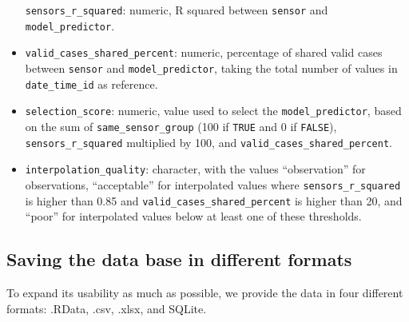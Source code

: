 \documentclass[]{article}
\begin{document}
\begin{itemize}
  \texttt{sensors\_r\_squared}: numeric, R squared between
  \texttt{sensor} and \texttt{model\_predictor}.
\item
  \texttt{valid\_cases\_shared\_percent}: numeric, percentage of shared
  valid cases between \texttt{sensor} and \texttt{model\_predictor},
  taking the total number of values in \texttt{date\_time\_id} as
  reference.
\item
  \texttt{selection\_score}: numeric, value used to select the
  \texttt{model\_predictor}, based on the sum of
  \texttt{same\_sensor\_group} (100 if \texttt{TRUE} and 0 if
  \texttt{FALSE}), \texttt{sensors\_r\_squared} multiplied by 100, and
  \texttt{valid\_cases\_shared\_percent}.
\item
  \texttt{interpolation\_quality}: character, with the values
  ``observation'' for observations, ``acceptable'' for interpolated
  values where \texttt{sensors\_r\_squared} is higher than 0.85 and
  \texttt{valid\_cases\_shared\_percent} is higher than 20, and ``poor''
  for interpolated values below at least one of these thresholds.
\end{itemize}

\hypertarget{saving-the-data-base-in-different-formats}{%
\subsection{Saving the data base in different
formats}\label{saving-the-data-base-in-different-formats}}

To expand its usability as much as possible, we provide the data in four
different formats: .RData, .csv, .xlsx, and SQLite.
\end{document}
